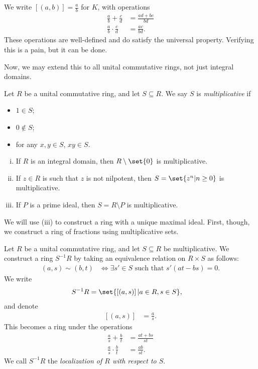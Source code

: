 \documentclass[10pt]{mypackage}
\begin{document}
We write $ \left[ \left( a,b \right) \right] = \frac{a}{b} $ for $K$, with operations
\begin{align*}
  \frac{a}{b} + \frac{c}{d} &= \frac{ad + bc}{bd}\\
  \frac{a}{b}\cdot \frac{c}{d} &= \frac{ac}{bd}.
\end{align*}
These operations are well-defined and do satisfy the universal property. Verifying this is a pain, but it can be done.\newline

Now, we may extend this to all unital commutative rings, not just integral domains.
\begin{definition}
  Let $R$ be a unital commutative ring, and let $S\subseteq R$. We say $S$ is \textit{multiplicative} if
  \begin{itemize}
    \item $1\in S$;
    \item $0\notin S$;
    \item for any $x,y\in S$, $xy\in S$.
  \end{itemize}
\end{definition}
\begin{example}\hfill
  \begin{enumerate}[(i)]
    \item If $R$ is an integral domain, then $R\setminus \set{0}$ is multiplicative.
    \item If $z\in R$ is such that $z$ is not nilpotent, then $S = \set{z^{n} | n\geq 0}$ is multiplicative.
    \item If $P$ is a prime ideal, then $S = R\setminus P$ is multiplicative.
  \end{enumerate}
\end{example}
We will use (iii) to construct a ring with a unique maximal ideal. First, though, we construct a ring of fractions using multiplicative sets.
\begin{definition}
  Let $R$ be a unital commutative ring, and let $S\subseteq R$ be multiplicative. We construct a ring $S^{-1}R$ by taking an equivalence relation on $R\times S$ as follows:
  \begin{align*}
    \left( a,s \right)\sim \left( b,t \right) &\Leftrightarrow \exists s'\in S\text{ such that }s'\left( at-bs \right) = 0.
  \end{align*}
  We write
  \begin{align*}
    S^{-1}R &= \set{\left[ \left( a,s \right) \right] | a\in R,s\in S},
  \end{align*}
  and denote
  \begin{align*}
    \left[ \left( a,s \right) \right] &= \frac{a}{s}.
  \end{align*}
  This becomes a ring under the operations
  \begin{align*}
    \frac{a}{s} + \frac{b}{t} &= \frac{at + bs}{st}\\
    \frac{a}{s}\cdot \frac{b}{t} &= \frac{ab}{st}.
  \end{align*}
  We call $S^{-1}R$ the \textit{localization of $R$ with respect to $S$}.
\end{definition}
\end{document}
